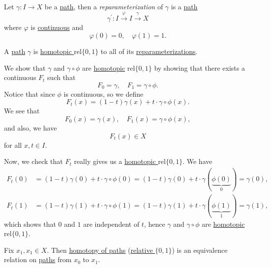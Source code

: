 \begin{definition}[Reparameterization]\label{def:reparameterization}
	Let \(\gamma\colon I\to X\) be a \hyperref[def:path]{path}, then a \emph{reparameterization} of \(\gamma\) is a \hyperref[def:path]{path}
	\[
		\gamma ^\prime \colon I\overset{\varphi }{\longrightarrow} I\overset{\gamma}{\longrightarrow} X
	\]
	where \(\varphi \) is \underline{continuous} and
	\[
		\varphi (0) = 0,\quad \varphi (1) = 1.
	\]
\end{definition}

\begin{exercise}
	A \hyperref[def:path]{path} \(\gamma\) is \hyperref[def:homotopy-relative]{homotopic \(\mathrm{rel} \{0, 1\}\)} to all of its
	\hyperref[def:reparameterization]{reparameterizations}.
\end{exercise}
\begin{answer}
	\par We show that \(\gamma\) and \(\gamma\circ \phi \) are \hyperref[def:homotopic]{homotopic} \(\mathrm{rel} \{0, 1\}\) by showing that
	there exists a continuous \(F_t\) such that
	\[
		F_0 = \gamma,\quad F_1 = \gamma\circ \phi.
	\]
	Notice that since \(\phi \) is continuous, so we define
	\[
		F_t(x) = (1 - t) \gamma(x) + t\cdot \gamma\circ \phi (x).
	\]
	We see that
	\[
		F_0(x) = \gamma(x),\quad F_1(x) = \gamma\circ \phi (x),
	\]
	and also, we have
	\[
		F_t(x)\in X
	\]
	for all \(x, t\in I\).

	\par Now, we check that \(F_t\) really gives us a \hyperref[def:homotopy-relative]{homotopic \(\mathrm{rel} \{0, 1\}\)}. We have
	\[
		\begin{split}
			F_t(0) &= (1 - t)\gamma(0) + t\cdot \gamma\circ \phi (0) = (1 - t)\gamma(0) + t\cdot \gamma(\underbrace{\phi (0)}_{0}) = \gamma(0),\\
			F_t(1) &= (1 - t)\gamma(1) + t\cdot \gamma\circ \phi (1) = (1 - t)\gamma(1) + t\cdot \gamma(\underbrace{\phi (1)}_{1}) = \gamma(1),
		\end{split}
	\]
	which shows that \(0\) and \(1\) are independent of \(t\), hence \(\gamma\) and \(\gamma\circ \phi \) are \hyperref[def:homotopy-relative]{homotopic \(\mathrm{rel} \{0, 1\}\)}.
\end{answer}

\begin{exercise}
	Fix \(x_1, x_1\in X\). Then \hyperref[def:homotopy-path]{\underline{homotopy of paths}} (\hyperref[def:homotopy-relative]{relative \(\{0, 1\}\)}) is an
	equivalence relation on \hyperref[def:path]{paths} from \(x_0\) to \(x_1\).
\end{exercise}

